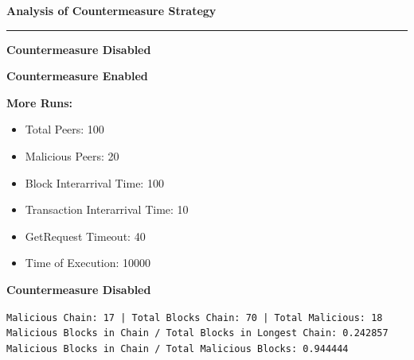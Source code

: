 \documentclass[a4paper,12pt]{article}
\newenvironment{solution}[2][]{%
\begin{mdframed}[linecolor=blue!70!black, linewidth=2pt, roundcorner=10pt, backgroundcolor=yellow!10!white, skipabove=12pt, skipbelow=12pt]%
	\textbf{\large #2}
	\par\noindent\rule{\textwidth}{0.4pt}
}{
\end{mdframed}
}
\begin{document}
\begin{solution}{Analysis of Countermeasure Strategy}
\textbf{Countermeasure Disabled}
\begin{figure}[H]
\centering
{} 

\end{figure}
\textbf{Countermeasure Enabled}
\vspace{0pt}
\begin{figure}[H]
\centering
{} 

\end{figure}

\textbf{More Runs:}
\begin{itemize}
	\vspace{-7pt}
	\item Total Peers: 100
	\vspace{-7pt}
	\item Malicious Peers: 20
	\vspace{-7pt}
	\item Block Interarrival Time: 100
	\vspace{-7pt}
	\item Transaction Interarrival Time: 10
	\vspace{-7pt}
	\item GetRequest Timeout: 40 
	\vspace{-7pt}
	\item Time of Execution: 10000
\end{itemize}

\textbf{Countermeasure Disabled}
\begin{figure}[H]
\centering
{} 

\end{figure}
\vspace{-15pt} 
\texttt{Malicious Chain: 17 |
Total Blocks Chain: 70 |
Total Malicious: 18\\
Malicious Blocks in Chain / Total Blocks in Longest Chain: 0.242857\\
Malicious Blocks in Chain / Total Malicious Blocks: 0.944444}\\


\end{solution}
\end{document}
